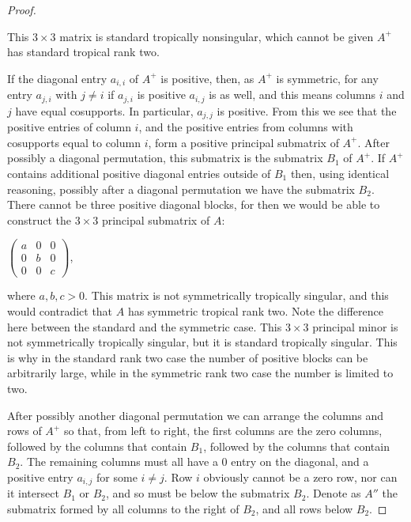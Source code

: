 \documentclass{article}
\begin{document}
\begin{proof}
\begin{center}
  \end{center}

  This $3 \times 3$ matrix is standard tropically nonsingular, which cannot be given $A^{+}$ has standard tropical rank two.

  If the diagonal entry $a_{i,i}$ of $A^{+}$ is positive, then, as $A^{+}$ is symmetric, for any entry $a_{j,i}$ with $j \neq i$ if $a_{j,i}$ is positive $a_{i,j}$ is as well, and this means columns $i$ and $j$ have equal cosupports. In particular, $a_{j,j}$ is positive. From this we see that the positive entries of column $i$, and the positive entries from columns with cosupports equal to column $i$, form a positive principal submatrix of $A^{+}$. After possibly a diagonal permutation, this submatrix is the submatrix $B_{1}$ of $A^{+}$. If $A^{+}$ contains additional positive diagonal entries outside of $B_{1}$ then, using identical reasoning, possibly after a diagonal permutation we have the submatrix $B_{2}$. There cannot be three positive diagonal blocks, for then we would be able to construct the $3 \times 3$ principal submatrix of $A$:
  \begin{center}
    $\left(\begin{array}{ccc} a & 0 & 0 \\ 0 & b & 0 \\ 0 & 0 & c \end{array}\right)$,
  \end{center}
  where $a,b,c > 0$. This matrix is not symmetrically tropically singular, and this would contradict that $A$ has symmetric tropical rank two. Note the difference here between the standard and the symmetric case. This $3 \times 3$ principal minor is not symmetrically tropically singular, but it is standard tropically singular. This is why in the standard rank two case the number of positive blocks can be arbitrarily large, while in the symmetric rank two case the number is limited to two.

  After possibly another diagonal permutation we can arrange the columns and rows of $A^{+}$ so that, from left to right, the first columns are the zero columns, followed by the columns that contain $B_{1}$, followed by the columns that contain $B_{2}$. The remaining columns must all have a $0$ entry on the diagonal, and a positive entry $a_{i,j}$ for some $i \neq j$. Row $i$ obviously cannot be a zero row, nor can it intersect $B_{1}$ or $B_{2}$, and so must be below the submatrix $B_{2}$. Denote as $A''$ the submatrix formed by all columns to the right of $B_{2}$, and all rows below $B_{2}$.
  

\end{proof}
\end{document}
